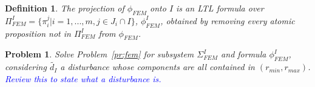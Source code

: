 \documentclass{article}
\newtheorem{definition}{Definition}
\newtheorem{problem}{Problem}
\newcommand*{\fran}[1]{\textcolor{blue}{#1}}
\begin{document}
\begin{definition}

The projection of $\phi_{FEM}$ onto $I$ is an LTL
formula over $\Pi_{FEM}^I = \{\pi_i^j | i = 1,...,m, j \in J_i \cap I\}$,
$\phi_{FEM}^I$, obtained by removing every atomic proposition not in
$\Pi_{FEM}^I$ from $\phi_{FEM}$.

\end{definition}

\begin{problem}

Solve Problem~\ref{pr:fem} for subsystem $\Sigma_{FEM}^I$ and formula
$\phi_{FEM}^I$, considering $\tilde{d_I}$ a disturbance whose components are
all contained in $(r_{min}, r_{max})$. \fran{Review this to state what
a disturbance is.}
    
\end{problem}
\end{document}
